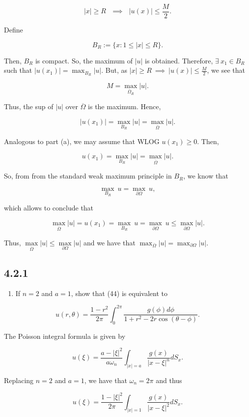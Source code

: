 \documentclass{article}
\begin{document}
$$|x|\geq R ~~~\implies~~~|u(x)|\leq \frac{M}{2}.$$

Define

$$B_R:=\{x : 1\leq|x| \leq R\}.$$

Then, $B_R$ is compact. So, the maximum of $|u|$ is obtained. Therefore, $\exists~x_1\in B_R$ such that $|u(x_1)|=\max_{B_R}|u|$. But, as $|x|\geq R ~\implies~|u(x)|\leq \frac{M}{2}$, we see that 

$$M=\underset{\overline\Omega_R}{\max}|u|.$$

Thus, the sup of $|u|$ over ${\overline\Omega}$ is the maximum. Hence,

$$|u(x_1)|=\underset{B_R}{\max}|u|=\underset{\overline\Omega}{\max}|u|.$$

Analogous to part (a), we may assume that WLOG $u(x_1)\geq 0$. Then,

$$u(x_1)=\underset{B_R}{\max}|u|=\underset{\overline\Omega}{\max}|u|.$$

So, from from the standard weak maximum principle in $B_R$, we know that

$$\underset{B_R}{\max}~u=\underset{\partial\Omega}{\max}~u,$$

which allows to conclude that

$$\underset{\overline\Omega}{\max}|u|=u(x_1)=\underset{B_R}{\max}~u=\underset{\partial\Omega}{\max}~u\leq \underset{\partial\Omega}{\max}|u|.$$

Thus, $\underset{\overline\Omega}{\max}|u| \leq\underset{\partial\Omega}{\max}|u|$ and we have that $\max_{\overline\Omega}|u| =\max_{\partial\Omega}|u|$.

\subsection{\textbf{4.2.1}}
\begin{enumerate}[label=(\alph*)]
    \item If $n=2$ and $a=1$, show that (44) is equivalent to
\end{enumerate}

$$u(r,\theta)=\frac{1-r^2}{2\pi}\int_0^{2\pi}\frac{g(\phi)d\phi}{1+r^2-2r\cos(\theta-\phi)}.$$

The Poisson integral formula is given by

$$u(\xi)=\frac{a-|\xi|^2}{a\omega_n}\int_{|x|=a}\frac{g(x)}{|x-\xi|^n}dS_x.$$

Replacing $n=2$ and $a=1$, we have that $\omega_n=2\pi$ and thus

$$u(\xi)=\frac{1-|\xi|^2}{2\pi}\int_{|x|=1}\frac{g(x)}{|x-\xi|^2}dS_x.$$
\end{document}
